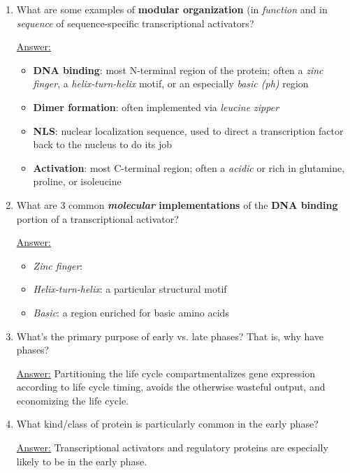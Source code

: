 \documentclass{article}
\newenvironment{QandA}{\begin{enumerate}[label=\bfseries Q\arabic*.]}
                       {\end{enumerate}}
\newenvironment{answered}{\par\normalfont\underline{Answer:}}{}
\begin{document}
\begin{QandA}
\begin{answered}
\begin{itemize}
    \end{itemize}
    \end{answered}
  \item{What are some examples of \textbf{modular organization} (in \textit{function} and in \textit{sequence} of sequence-specific transcriptional activators?}
    \begin{answered}
    \begin{itemize}
      \item{\textbf{DNA binding}: most N-terminal region of the protein; often a \textit{zinc finger}, a \textit{helix-turn-helix} motif, or an especially \textit{basic (ph)} region}
      \item{\textbf{Dimer formation}: often implemented via \textit{leucine zipper}}
      \item{\textbf{NLS}: nuclear localization sequence, used to direct a transcription factor back to the nucleus to do its job}
      \item{\textbf{Activation}: most C-terminal region; often a \textit{acidic} or rich in glutamine, proline, or isoleucine}
    \end{itemize}
    \end{answered}
  \item{What are 3 common \textbf{\textit{molecular} implementations} of the \textbf{DNA binding} portion of a transcriptional activator?}
    \begin{answered}
    \begin{itemize}
      \item{\textit{Zinc finger}: }
      \item{\textit{Helix-turn-helix}: a particular structural motif}
      \item{\textit{Basic}: a region enriched for basic amino acids}
    \end{itemize}
    \end{answered}
  \item{What's the primary purpose of early vs. late phases? That is, why have phases?}
    \begin{answered}
    Partitioning the life cycle compartmentalizes gene expression according to life cycle timing, avoids the otherwise wasteful output, and economizing the life cycle.
    \end{answered}
  \item{What kind/class of protein is particularly common in the early phase?}
    \begin{answered}
    Transcriptional activators and regulatory proteins are especially likely to be in the early phase.

\end{answered}
\end{QandA}
\end{document}
